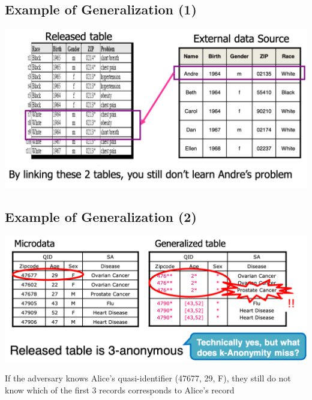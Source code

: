 \documentclass[11pt]{article}
\theoremstyle{definition}
\begin{document}
\subsection{Example of Generalization (1)}
\includegraphics[width=\textwidth/2]{19.png}

\subsection{Example of Generalization (2)}
\includegraphics[width=\textwidth/2]{20.png}

If the adversary knows Alice’s quasi-identifier
(47677, 29, F), they still do not know which of the
first 3 records corresponds to Alice’s record
\end{document}

